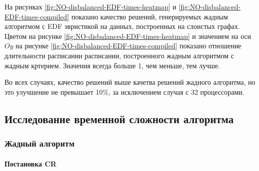 На рисунках \ref{fig:NO-disbalanced-EDF-times-heatmap} и \ref{fig:NO-disbalanced-EDF-times-compiled} показано качество решений, генерируемых жадным алгоритмом с EDF эвристикой на данных, построенных на слоистых графах. Цветом на рисунке \ref{fig:NO-disbalanced-EDF-times-heatmap} и значением на оси $Oy$ на рисунке \ref{fig:NO-disbalanced-EDF-times-compiled} показано отношение длительности расписании расписании, построенного жадным алгоритмом с жадным кртерием. Значения всегда больше 1, чем меньше, тем лучше.

Во всех случаях, качество решений выше качетва решений жадного алгоритма, но это улучшение не превышает 10\%, за исключением случая с 32 процессорами.

\subsection{Исследование временной сложности алгоритма}

\subsubsection{Жадный алгоритм}

\paragraph{Постановка CR}

